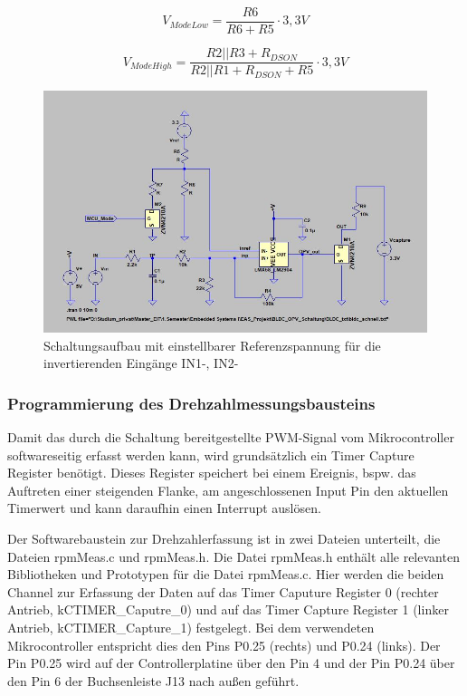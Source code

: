 \begin{equation}\label{eq1}
V_{ModeLow} = \frac{ R6 }{R6 + R5 }\cdot 3,3V
\end{equation}

\begin{equation}\label{eq1}
V_{ModeHigh} = \frac{ R2 || R3 + R_{DSON} }{R2 || R1 + R_{DSON} + R5 }\cdot 3,3V
\end{equation}

\begin{figure}[H] %
\includegraphics[width=.99\textwidth]{sec4/images/Schaltungserweiterung} 
\centering
\captionsetup{width=.95\textwidth}
\caption[Schaltungserweiterung]{Schaltungsaufbau mit einstellbarer Referenzspannung für die invertierenden Eingänge IN1-, IN2-}\centering
\label{fig:Schaltungserweiterung}
\end{figure}

\subsubsection{Programmierung des Drehzahlmessungsbausteins}\label{Sec4Sub5Sub4}

Damit das durch die Schaltung bereitgestellte PWM-Signal vom Mikrocontroller softwareseitig erfasst werden kann, wird grundsätzlich ein Timer Capture Register benötigt. Dieses Register speichert bei einem Ereignis, bspw. das Auftreten einer steigenden Flanke, am angeschlossenen Input Pin den aktuellen Timerwert und kann daraufhin einen Interrupt auslösen.\vspace{11pt}

Der Softwarebaustein zur Drehzahlerfassung ist in zwei Dateien unterteilt, die Dateien \glqq{}rpmMeas.c\grqq{} und \glqq{}rpmMeas.h\grqq{}. Die Datei \glqq{}rpmMeas.h\grqq{} enthält alle relevanten Bibliotheken und Prototypen für die Datei \glqq{}rpmMeas.c\grqq{}. Hier werden die beiden Channel zur Erfassung der Daten auf das Timer Caputure Register 0 (rechter Antrieb, \glqq{}kCTIMER\_Caputre\_0\grqq{}) und auf das Timer Capture Register 1 (linker Antrieb, \glqq{}kCTIMER\_Capture\_1\grqq{}) festgelegt. Bei dem verwendeten Mikrocontroller entspricht dies den Pins P0.25 (rechts) und P0.24 (links). Der Pin P0.25 wird auf der Controllerplatine über den Pin 4 und der Pin P0.24 über den Pin 6 der Buchsenleiste J13 nach außen geführt.\vspace{11pt}

